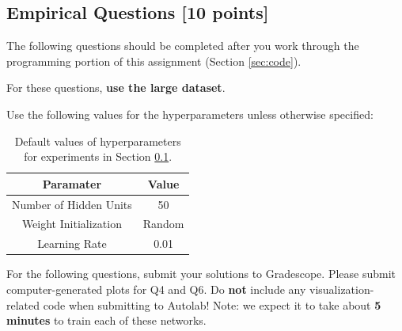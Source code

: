 \documentclass[11pt]{exam}
\numberwithin{equation}{section} %
\numberwithin{figure}{section} %
\numberwithin{table}{section} %
\begin{document}
\subsection{Empirical Questions [10 points]}
\label{sec:interp}

The following questions should be completed after you work through the programming portion of this assignment (Section \ref{sec:code}).

For these questions, \textbf{use the large dataset}.

Use the following values for the hyperparameters unless otherwise specified:

\begin{table}[H]
    \centering
    \begin{tabular}{|c|c|}
        \hline
        \textbf{Paramater} & \textbf{Value} \\
        \hline
        Number of Hidden Units & 50 \\
        \hline
        Weight Initialization & {\sc Random} \\
        \hline
        Learning Rate & 0.01 \\
        \hline
        
    \end{tabular}
    \caption{Default values of hyperparameters for experiments in Section \ref{sec:interp}.}
    \label{tab:params}
\end{table}

 For the following questions, submit your solutions to Gradescope. Please submit computer-generated plots for Q4 and Q6. Do {\bf not} include any visualization-related code when submitting to Autolab! Note: we expect it to take about {\bf 5 minutes} to train each of these networks.
 
\end{document}
